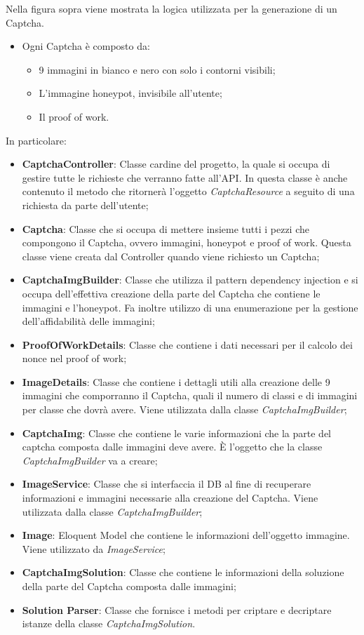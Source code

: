 Nella figura sopra viene mostrata la logica utilizzata per la generazione di un  Captcha.
\begin{itemize}
    \item  Ogni Captcha è composto da:
    \begin{itemize}
        \item 9 immagini in bianco e nero con solo i contorni visibili;
        \item L'immagine honeypot, invisibile all'utente;
        \item Il proof of work.
    \end{itemize}
\end{itemize}

In particolare:
\begin{itemize}
    \item \textbf{CaptchaController}: Classe cardine del progetto, la quale si occupa di gestire tutte le richieste che verranno fatte all'API. In questa classe è anche contenuto il metodo che ritornerà l'oggetto \textit{CaptchaResource} a seguito di una richiesta da parte dell'utente;
    \item \textbf{Captcha}: Classe che si occupa di mettere insieme tutti i pezzi che compongono il Captcha, ovvero immagini, honeypot e proof of work. Questa classe viene creata dal Controller quando viene richiesto un Captcha;
    \item \textbf{CaptchaImgBuilder}: Classe che utilizza il pattern dependency injection e si occupa dell'effettiva creazione della parte del Captcha che contiene le immagini e l'honeypot. Fa inoltre utilizzo di una enumerazione per la gestione dell'affidabilità delle immagini;
    \item \textbf{ProofOfWorkDetails}: Classe che contiene i dati necessari per il calcolo dei nonce nel proof of work;
    \item \textbf{ImageDetails}: Classe che contiene i dettagli utili alla creazione delle 9 immagini che comporranno il Captcha, quali il numero di classi e di immagini per classe che dovrà avere. Viene utilizzata dalla classe \textit{CaptchaImgBuilder};
    \item \textbf{CaptchaImg}: Classe che contiene le varie informazioni che la parte del captcha composta dalle immagini deve avere. È l'oggetto che la classe \textit{CaptchaImgBuilder} va a creare;
    \item \textbf{ImageService}: Classe che si interfaccia il DB al fine di recuperare informazioni e immagini necessarie alla creazione del Captcha. Viene utilizzata dalla classe \textit{CaptchaImgBuilder};
    \item \textbf{Image}: Eloquent Model che contiene le informazioni dell'oggetto immagine. Viene utilizzato da \textit{ImageService};
    \item \textbf{CaptchaImgSolution}: Classe che contiene le informazioni della soluzione della parte del Captcha composta dalle immagini;
    \item \textbf{Solution Parser}: Classe che fornisce i metodi per criptare e decriptare istanze della classe \textit{CaptchaImgSolution}.
\end{itemize}

